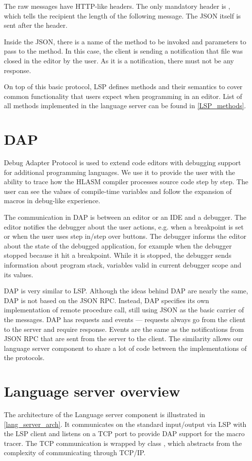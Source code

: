 The raw messages have HTTP-like headers. The only mandatory header is , which tells the recipient the length of the following message. The JSON itself is sent after the header.

Inside the JSON, there is a name of the method to be invoked and parameters to pass to the method. In this case, the client is sending a notification that file  was closed in the editor by the user. As it is a notification, there must not be any response.

On top of this basic protocol, LSP defines methods and their semantics to cover common functionality that users expect when programming in an editor. List of all methods implemented in the language server can be found in \cref{LSP_methods}.

\section{DAP}
Debug Adapter Protocol is used to extend code editors with debugging support for additional programming languages. We use it to provide the user with the ability to trace how the HLASM compiler processes source code step by step. The user can see the values of compile-time variables and follow the expansion of macros in debug-like experience.

The communication in DAP is between an editor or an IDE and a debugger. The editor notifies the debugger about the user actions, e.g. when a breakpoint is set or when the user uses step in/step over buttons. The debugger informs the editor about the state of the debugged application, for example when the debugger stopped because it hit a breakpoint. While it is stopped, the debugger sends information about program stack, variables valid in current debugger scope and its values.

DAP is very similar to LSP. Although the ideas behind DAP are nearly the same, DAP is not based on the JSON RPC. Instead, DAP specifies its own implementation of remote procedure call, still using JSON as the basic carrier of the messages. DAP has requests and events --- requests always go from the client to the server and require response. Events are the same as the notifications from JSON RPC that are sent from the server to the client. The similarity allows our language server component to share a lot of code between the implementations of the protocols.

\section{Language server overview}
The architecture of the Language server component is illustrated in \cref{lang_server_arch}. It communicates on the standard input/output via LSP with the LSP client and listens on a TCP port to provide DAP support for the macro tracer. The TCP communication is wrapped by class , which abstracts from the complexity of communicating through TCP/IP.


